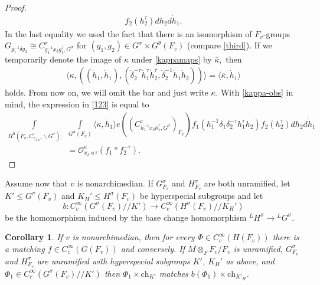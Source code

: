 \documentclass[12pt]{amsart}
\newtheorem{cor}[thm]{Corollary}
\theoremstyle{remark}
\numberwithin{equation}{section}
\newcommand{\lto}{\longrightarrow}
\theoremstyle{definition}
\numberwithin{equation}{subsection}
\begin{document}
\begin{proof}
\begin{align}
f_{2}(h_{2}^{\tau}) dh_{2} d\dot{h}_{1}.
\end{align}
In the last equality we used the fact that there is an isomorphism of $F_v$-groups
$G_{g_{1}^{-1} \delta g_{2}} \cong C^{\tau}_{g_{1}^{-1} x_{\delta} g^{\tau}_{1}, G^{\sigma}}$ for $(g_1,g_2) \in G^{\sigma} \times G^{\theta}(F_v)$ (compare \eqref{third}).  If we temporarily denote the image of $\kappa$ under \eqref{kappamaps} by $\overline{\kappa},$ then
\begin{align} \label{kappa-obs}
\langle
\kappa, ((\dot{h}_1,\dot{h}_1),(\dot{\delta}_2^{-\tau} \dot{h}_1^{\tau}\dot{h}_2^{\tau},\dot{\delta}_2^{-1} \dot{h}_1\dot{h}_2)) \rangle  =
\langle \overline{\kappa}, \dot{h}_{1} \rangle
\end{align}
 holds. From now on, we will omit the bar and just write $\kappa$.  With \eqref{kappa-obs} in mind,
 the expression in \eqref{123} is equal to
\begin{align*}
\int\limits_{H^{0}(F_{v}, C^{\tau}_{x_{\delta, G^{\sigma}}} \backslash
G^{\sigma})}&
\int\limits_{G^{\sigma} (F_{v})}
\langle \kappa, \dot{h}_{1} \rangle
e((C^{\tau}_{h_{1}^{-1} x_{\delta} h^{\tau}_{1}, G^{\sigma}})_{F_{v}})
f_{1}(h_{1}^{-1} \delta_{1} \delta_{2}^{- \tau} h_{1}^{\tau} h_{2})
f_{2}(h_{2}^{\tau}) dh_{2} d\dot{h}_{1} \\
& =
\mathcal{O}^{\kappa}_{x_{\delta} \rtimes \tau}(f_1 *f_2^{-\tau}).
\end{align*}

\end{proof}



Assume now that $v$ is nonarchimedian.  If $G^{\sigma}_{F_v}$ and $H^{\sigma}_{F_v}$ are both unramified, let $K' \leq G^{\sigma}(F_v)$ and $K_H' \leq H^{\sigma}(F_v)$ be hyperspecial subgroups and let
$$
b:C_c^{\infty}(G^{\sigma}(F_v)//K') \lto C_c^{\infty}(H^{\sigma}(F_{v})//K_H')
$$be the homomorphism induced by the base change homomorphism ${}^LH^{\sigma} \to {}^L G^{\sigma}$.

\begin{cor} \label{fl-e-spl}  If $v$ is nonarchimedian, then for every $\Phi \in C_c^{\infty}(H(F_v))$ there is a matching
$f \in C_c^{\infty}(G(F_v))$ and
conversely.  If $M \otimes_F F_v/F_v$ is unramified, $G^{\sigma}_{F_v}$ and $H^{\sigma}_{F_v}$ are unramified with hyperspecial subgroups $K'$, $K_H'$ as above, and $\Phi_1 \in C_c^{\infty}(G^{\sigma}( F_v)//K')$ then
$\Phi_1 \times \mathrm{ch}_{K'}$ matches $b(\Phi_1) \times \mathrm{ch}_{K'_H}$.
\end{cor}
\end{document}
